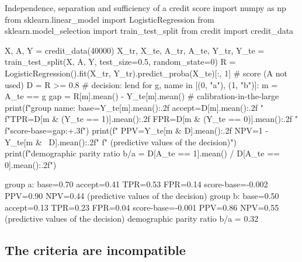 \begin{pylisting}[label={lst:fairmetrics}]{Independence, separation and sufficiency of a credit score}
import numpy as np
from sklearn.linear_model import LogisticRegression
from sklearn.model_selection import train_test_split
from credit import credit_data

X, A, Y = credit_data(40000)
X_tr, X_te, A_tr, A_te, Y_tr, Y_te = train_test_split(X, A, Y, test_size=0.5,
                                                      random_state=0)
R = LogisticRegression().fit(X_tr, Y_tr).predict_proba(X_te)[:, 1]   # score (A not used)
D = R >= 0.8                                                          # decision: lend
for g, name in [(0, "a"), (1, "b")]:
    m = A_te == g
    gap = R[m].mean() - Y_te[m].mean()  # calibration-in-the-large
    print(f"group {name}: base={Y_te[m].mean():.2f} accept={D[m].mean():.2f} "
          f"TPR={D[m & (Y_te == 1)].mean():.2f} FPR={D[m & (Y_te == 0)].mean():.2f} "
          f"score-base={gap:+.3f}")
    print(f"         PPV={Y_te[m & D].mean():.2f} NPV={1 - Y_te[m & ~D].mean():.2f}"
          f"  (predictive values of the decision)")
print(f"demographic parity ratio b/a = {D[A_te == 1].mean() / D[A_te == 0].mean():.2f}")
\end{pylisting}
\begin{pyoutput}
group a: base=0.70 accept=0.41 TPR=0.53 FPR=0.14 score-base=-0.002
         PPV=0.90 NPV=0.44  (predictive values of the decision)
group b: base=0.50 accept=0.13 TPR=0.23 FPR=0.04 score-base=-0.001
         PPV=0.86 NPV=0.55  (predictive values of the decision)
demographic parity ratio b/a = 0.32
\end{pyoutput}

\subsection{The criteria are incompatible}

